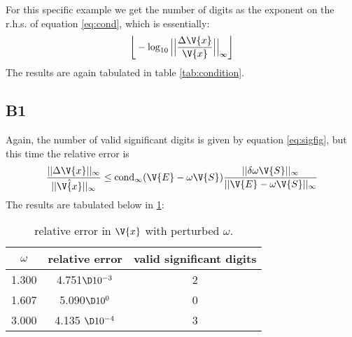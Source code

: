 \documentclass[a4paper,10pt]{article}
\begin{document}
	For this specific example we get the number of digits as the exponent on the r.h.s. of equation \ref{eq:cond}, which is essentially:
	\begin{equation}\label{eq:sigfig}
		\bigg\lfloor -\log_{10} \Big|\Big|\frac{\Delta \V{x}}{\V{x}}\Big|\Big|_{\infty}\bigg\rfloor
	\end{equation}
	The results are again tabulated in table \ref{tab:condition}.
	
	\subsection*{B1}
	Again, the number of valid significant digits is given by equation \ref{eq:sigfig}, but this time the relative error is
	\begin{equation}\label{key}
		\frac{||\Delta \V{x} ||_{\infty}}{||\hat{\V{x}} ||_{\infty}} \leq \text{cond}_{\infty} (\V{E} - \omega \V{S}) \frac{||\delta \omega \V{S}||_{\infty}}{||\V{E} - \omega \V{S}||_{\infty}}
	\end{equation}
	The results are tabulated below in \ref{tab:perturbed}:
	\begin{table}[H]
		\centering
		\begin{tabular}{c|c|c}
			$ \omega $ & relative error & valid significant digits \\
			\hline
			1.300 & 4.751$ \D 10^{-3} $ & 2\\
			1.607 & 5.090$ \D 10^0 $ & 0\\
			3.000 & 4.135 $ \D 10^{-4} $ & 3 
		\end{tabular}
		\caption{relative error in $ \V{x} $ with perturbed $ \omega $.}
		\label{tab:perturbed}
	\end{table}
	
\end{document}
